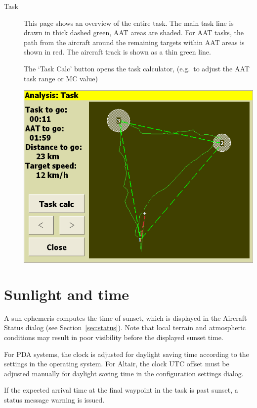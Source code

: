 \documentclass[a4paper,12pt]{refrep}
\begin{document}
\begin{description}
\item[Task]
  This page shows an overview of the entire task.  The main task line
  is drawn in thick dashed green, AAT areas are shaded.  For AAT
  tasks, the path from the aircraft around the remaining targets within AAT
  areas is shown in red.  The aircraft track is shown as a thin green line.

  The `Task Calc' button opens the task calculator,
  (e.g.\ to adjust the AAT task range or MC value)

\begin{center}
\includegraphics[angle=0,width=0.8\linewidth,keepaspectratio='true']{figures/analysis-task.png}
\end{center}

\end{description}

\section{Sunlight and time}

A sun ephemeris computes the time of sunset, which is displayed in the
Aircraft Status dialog (see Section~\ref{sec:status}).  Note that
local terrain and atmospheric conditions may result in poor visibility
before the displayed sunset time.

For PDA systems, the clock is adjusted for daylight saving time according
to the settings in the operating system.  For Altair, the clock UTC offset
must be adjusted manually for daylight saving time in the configuration
settings dialog.

If the expected arrival time at the final waypoint in the task is past
sunset, a status message warning is issued.

\end{document}
